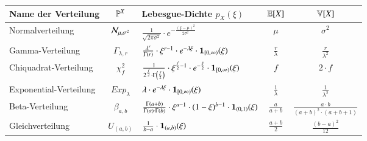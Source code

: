 \begin{table}
	\renewcommand{\arraystretch}{1.6}
	\centering
	\begin{tabular}{l | c | l | c | c}
		Name der Verteilung			&	$\mathbb{P}^X$				& 	Lebesgue-Dichte $p_X(\xi)$																							& $\mathbb{E}[X]$ 				&	$\mathbb{V}[X]$
	\\ \hline
		Normalverteilung			&	$\mathcal{N}_{\mu, \sigma^2}$	& 	$\frac{1}{\sqrt{2 \pi \sigma^2}} \cdot e^{-\frac{(\xi - \mu)^2}{2 \sigma^2}}$															& $\mu$ 				& 	$\sigma^2$
	\\
		Gamma-Verteilung 			& 	$\Gamma_{\lambda, r}$ 	&	$\frac{\lambda^r}{\Gamma(r)} \cdot \xi^{r - 1} \cdot e^{-\lambda \xi} \cdot \bm{1}_{[0, \infty)}(\xi)$										& $\frac{r}{\lambda}$ 	& 	$\frac{r}{\lambda^2}$
	\\
		Chiquadrat-Verteilung		& 	$\chi_f^2$ 			& 	$\frac{1}{2^{\frac{f}{2}} \cdot \Gamma\left( \frac{f}{2} \right)} \cdot \xi^{\frac{f}{2} - 1} \cdot e^{-\frac{\xi}{2}} \cdot \bm{1}_{[0, \infty)}(\xi)$	& $f$		& $2 \cdot f$
	\\
		Exponential-Verteilung		&	$Exp_\lambda$ 		&	$\lambda \cdot e^{-\lambda \xi} \cdot \bm{1}_{[0, \infty)}(\xi)$ 																& $\frac{1}{\lambda}$	& 	$\frac{1}{\lambda^2}$
	\\
		Beta-Verteilung 			& 	$\beta_{a, b}$ 			& 	$\frac{\Gamma(a + b)}{\Gamma(a) \cdot \Gamma(b)} \cdot \xi^{a - 1} \cdot (1 - \xi)^{b - 1} \cdot \bm{1}_{(0, 1)}(\xi)$ 						& $\frac{a}{a + b}$ 		&	$\frac{a \cdot b}{(a + b)^2 \cdot (a + b + 1)}$
	\\
		Gleichverteilung 			& 	$U_{(a, b)}$			& 	$\frac{1}{b - a} \cdot \bm{1}_{(a, b)}(\xi)$ 																				& $\frac{a + b}{2}$ 		& 	$\frac{(b - a)^2}{12}$ 
	\end{tabular}
\end{table}
